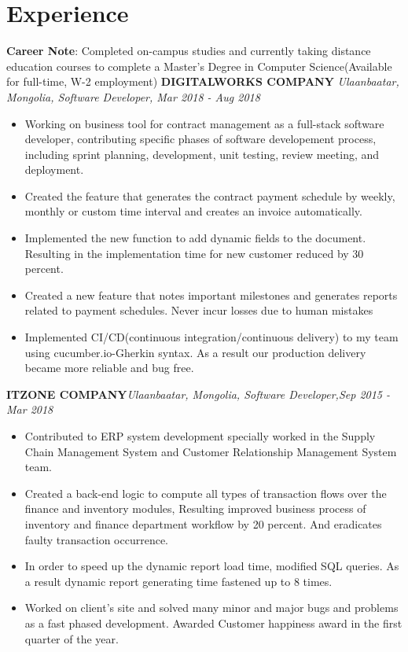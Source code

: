 \documentclass[letterpaper,11pt]{article}
\newcommand{\resumeItemListStart}{\begin{itemize}}
\newcommand{\resumeItemListEnd}{\end{itemize}\vspace{-5pt}}
\begin{document}
\section{Experience}
  \textbf{Career Note}{: Completed on-campus studies and currently taking distance education courses to complete a Master's Degree in Computer Science(Available for full-time, W-2 employment)}
    \vfill
      \textbf{DIGITALWORKS COMPANY} \hfill \textit{Ulaanbaatar, Mongolia, Software Developer, Mar 2018 - Aug 2018}
        \resumeItemListStart
          \item{
            Working on business tool for contract management as a full-stack software developer, contributing specific phases of software developement process, including sprint planning, development, unit testing, review meeting, and deployment.
          }
          \item{
            Created the feature that generates the contract payment schedule by weekly, monthly or custom time interval and creates an invoice automatically.
          }
          \item{
            Implemented the new function to add dynamic fields to the document. Resulting in the implementation time for new customer reduced by 30 percent.
          }
          \item{
            Created a new feature that notes important milestones and generates reports related to payment schedules. Never incur losses due to human mistakes
          }
          \item{
            Implemented CI/CD(continuous integration/continuous delivery) to my team using cucumber.io-Gherkin syntax.
            As a result our production delivery became more reliable and bug free.
          }
        \resumeItemListEnd
  
      \textbf{ITZONE COMPANY}\hfill \textit{Ulaanbaatar, Mongolia, Software Developer,Sep 2015 - Mar 2018}
      \resumeItemListStart
        \item{
          Contributed to ERP system development specially worked in the Supply Chain Management System and Customer Relationship Management System team.
        }
        \item{
          Created a back-end logic to compute all types of transaction flows over the finance and inventory modules, Resulting improved business process of inventory and finance department workflow by 20 percent. And eradicates faulty transaction occurrence.
        }
        \item{
          In order to speed up the dynamic report load time, modified SQL queries. As a result dynamic report generating time fastened up to 8 times.
        }
        \item{
          Worked on client's site and solved many minor and major bugs and problems as a fast phased development. Awarded Customer happiness award in the first quarter of the year.
        }
      \resumeItemListEnd
  
\end{document}

